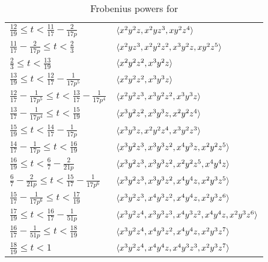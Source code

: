 \documentclass{article}
\begin{document}
\begin{example}
{\begin{table}
\begin{tabular}{ll}
        $\frac{12}{19} \le t < \frac{11}{17} - \frac2{17 p}$ & $\langle x^2y^2z, x^2yz^3, xy^2z^4 \rangle$ \\
        $\frac{11}{17} - \frac2{17 p} \le t < \frac23$ & $\langle x^2yz^3, x^2y^2z^2, x^3y^2z, xy^2z^5 \rangle$ \\
        $\frac23 \le t < \frac{13}{19}$ & $\langle x^2y^2z^2, x^3y^2z \rangle$ \\
        $\frac{13}{19} \le t < \frac{12}{17} - \frac1{17 p^5}$ & $\langle x^2y^2z^2, x^3y^3z \rangle$ \\
        $\frac{12}{17} - \frac1{17 p^5} \le t < \frac{13}{17} - \frac1{17 p^4}$ & $\langle x^2y^2z^3, x^3y^2z^2, x^3y^3z \rangle$ \\
        $\frac{13}{17} - \frac1{17 p^4} \le t < \frac{15}{19}$ & $\langle x^3y^2z^2, x^3y^3z, x^2y^2z^4 \rangle$ \\
        $\frac{15}{19} \le t < \frac{14}{17} - \frac1{17 p}$ & $\langle x^3y^3z, x^2y^2z^4, x^3y^2z^3 \rangle$ \\
        $\frac{14}{17} - \frac1{17 p} \le t < \frac{16}{19}$ & $\langle x^3y^2z^3, x^3y^3z^2, x^4y^3z, x^2y^2z^5 \rangle$ \\
        $\frac{16}{19} \le t < \frac67 - \frac2{21 p}$ & $\langle x^3y^2z^3, x^3y^3z^2, x^2y^2z^5, x^4y^4z \rangle$ \\
        $\frac67 - \frac2{21 p} \le t < \frac{15}{17} - \frac1{17 p^6}$ & $\langle x^3y^2z^3, x^3y^3z^2, x^4y^4z, x^2y^3z^5 \rangle$ \\
        $\frac{15}{17} - \frac1{17 p^6} \le t < \frac{17}{19}$ & $\langle x^3y^2z^3, x^4y^3z^2, x^4y^4z, x^2y^3z^6 \rangle$ \\
        $\frac{17}{19} \le t < \frac{16}{17} - \frac1{51 p}$ & $\langle x^3y^2z^4, x^3y^3z^3, x^4y^3z^2, x^4y^4z, x^2y^3z^6 \rangle$ \\
        $\frac{16}{17} - \frac1{51 p} \le t < \frac{18}{19}$ & $\langle x^3y^2z^4, x^4y^3z^2, x^4y^4z, x^2y^3z^7 \rangle$ \\
        $\frac{18}{19} \le t < 1$ & $\langle x^3y^2z^4, x^4y^4z, x^4y^3z^3, x^2y^3z^7 \rangle$ \\
        \bottomrule
      \end{tabular}
      \endgroup
   \caption{Frobenius powers for }
   \label{table: main example}
\end{table}
\clearpage
}
\end{example}
\end{document}
